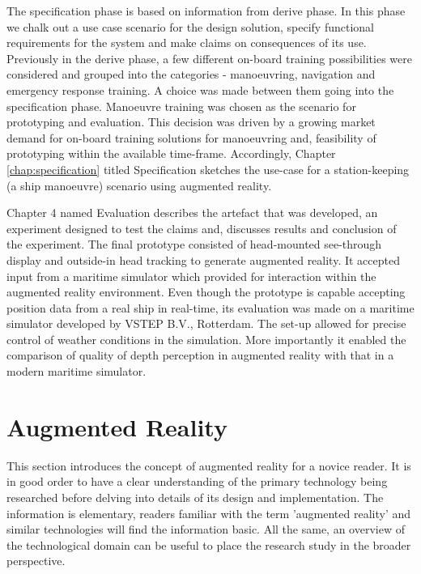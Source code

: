 The specification phase is based on information from derive phase. In this phase we chalk out a use case scenario for the design solution, specify functional requirements for the system and make claims on consequences of its use. Previously in the derive phase, a few different on-board training possibilities were considered and grouped into the categories - manoeuvring, navigation and emergency response training. A choice was made between them going into the specification phase. Manoeuvre training was chosen as the scenario for prototyping and evaluation. This decision was driven by a growing market demand for on-board training solutions for manoeuvring and, feasibility of prototyping within the available time-frame. Accordingly, Chapter \ref{chap:specification} titled Specification sketches the use-case for a station-keeping (a ship manoeuvre) scenario using augmented reality. 

Chapter 4 named Evaluation describes the artefact that was developed, an experiment designed to test the claims and, discusses results and conclusion of the experiment. The final prototype consisted of head-mounted see-through display and outside-in head tracking to generate augmented reality. It accepted input from a maritime simulator which provided for interaction within the augmented reality environment. Even though the prototype is capable accepting position data from a real ship in real-time, its evaluation was made on a maritime simulator developed by VSTEP B.V., Rotterdam. The set-up allowed for precise control of weather conditions in the simulation. More importantly it enabled the comparison of quality of depth perception in augmented reality with that in a modern maritime simulator.




\section{Augmented Reality}
\label{sec:augreal}
This section introduces the concept of augmented reality for a novice reader. It is in good order to have a clear understanding of the primary technology being researched before delving into details of its design and implementation. The information is elementary, readers familiar with the term 'augmented reality' and similar technologies will find the information basic. All the same, an overview of the technological domain can be useful to place the research study in the broader perspective.

